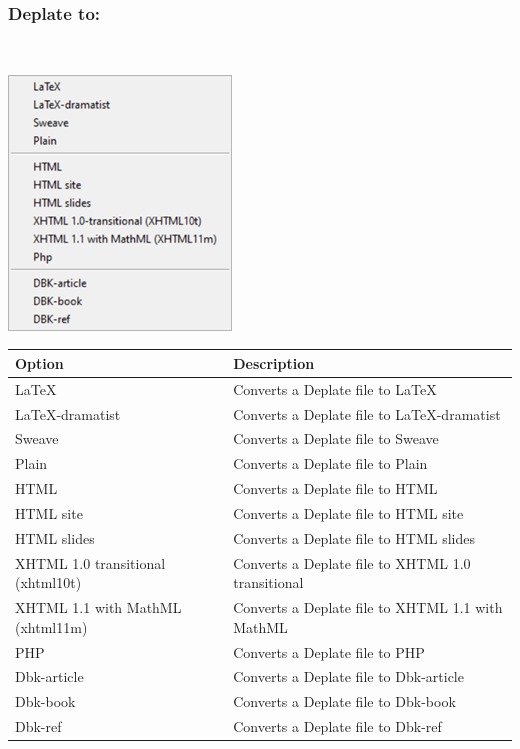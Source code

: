 \hypertarget{menu_tools_processing_conversion_deplate}{}
\subsubsection{Deplate to:}\\

\includegraphics[scale=0.8]{./res/menu_tools_processing_conversion_deplate.png}\\

\begin{scriptsize}
  \begin{tabularx}{\textwidth}{>{\hsize=0.6\hsize}X>{\hsize=0.7\hsize}X}\\
    \hline
    \textbf{Option} & \textbf{Description} \\
    \hline
    \LaTeX & Converts a Deplate file to \LaTeX \\
    LaTeX-dramatist & Converts a Deplate file to LaTeX-dramatist \\
    Sweave & Converts a Deplate file to Sweave \\
    Plain & Converts a Deplate file to Plain \\
    \hdashline[1pt/1pt]
    HTML & Converts a Deplate file to HTML \\
    HTML site & Converts a Deplate file to HTML site \\
    HTML slides & Converts a Deplate file to HTML slides \\
    XHTML 1.0 transitional (xhtml10t) & Converts a Deplate file to XHTML 1.0 transitional \\
    XHTML 1.1 with MathML (xhtml11m) & Converts a Deplate file to XHTML 1.1 with MathML \\
    PHP & Converts a Deplate file to PHP \\
    \hdashline[1pt/1pt]
    Dbk-article & Converts a Deplate file to Dbk-article \\
    Dbk-book & Converts a Deplate file to Dbk-book \\
    Dbk-ref & Converts a Deplate file to Dbk-ref \\
    \hline
  \end{tabularx}
\end{scriptsize}

